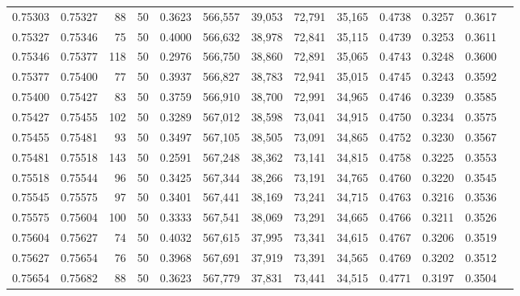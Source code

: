 \begin{tabular}{rrrrrrrrrrrrr}
0.75303 & 0.75327 &    88 &  50 &                                     0.3623 & 566,557 &  39,053 &  72,791 &  35,165 & 0.4738 & 0.3257 & 0.3617 \\
0.75327 & 0.75346 &    75 &  50 &                                     0.4000 & 566,632 &  38,978 &  72,841 &  35,115 & 0.4739 & 0.3253 & 0.3611 \\
0.75346 & 0.75377 &   118 &  50 &                                     0.2976 & 566,750 &  38,860 &  72,891 &  35,065 & 0.4743 & 0.3248 & 0.3600 \\
0.75377 & 0.75400 &    77 &  50 &                                     0.3937 & 566,827 &  38,783 &  72,941 &  35,015 & 0.4745 & 0.3243 & 0.3592 \\
0.75400 & 0.75427 &    83 &  50 &                                     0.3759 & 566,910 &  38,700 &  72,991 &  34,965 & 0.4746 & 0.3239 & 0.3585 \\
0.75427 & 0.75455 &   102 &  50 &                                     0.3289 & 567,012 &  38,598 &  73,041 &  34,915 & 0.4750 & 0.3234 & 0.3575 \\
0.75455 & 0.75481 &    93 &  50 &                                     0.3497 & 567,105 &  38,505 &  73,091 &  34,865 & 0.4752 & 0.3230 & 0.3567 \\
0.75481 & 0.75518 &   143 &  50 &                                     0.2591 & 567,248 &  38,362 &  73,141 &  34,815 & 0.4758 & 0.3225 & 0.3553 \\
0.75518 & 0.75544 &    96 &  50 &                                     0.3425 & 567,344 &  38,266 &  73,191 &  34,765 & 0.4760 & 0.3220 & 0.3545 \\
0.75545 & 0.75575 &    97 &  50 &                                     0.3401 & 567,441 &  38,169 &  73,241 &  34,715 & 0.4763 & 0.3216 & 0.3536 \\
0.75575 & 0.75604 &   100 &  50 &                                     0.3333 & 567,541 &  38,069 &  73,291 &  34,665 & 0.4766 & 0.3211 & 0.3526 \\
0.75604 & 0.75627 &    74 &  50 &                                     0.4032 & 567,615 &  37,995 &  73,341 &  34,615 & 0.4767 & 0.3206 & 0.3519 \\
0.75627 & 0.75654 &    76 &  50 &                                     0.3968 & 567,691 &  37,919 &  73,391 &  34,565 & 0.4769 & 0.3202 & 0.3512 \\
0.75654 & 0.75682 &    88 &  50 &                                     0.3623 & 567,779 &  37,831 &  73,441 &  34,515 & 0.4771 & 0.3197 & 0.3504 \\

\end{tabular}
